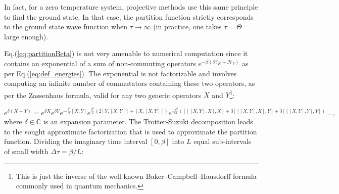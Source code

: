 In fact, for a zero temperature system, projective methods use this same principle to find the ground state.
In that case, the partition function strictly corresponds to the ground state wave function when $\tau \rightarrow \infty$ (in practice, one takes $\tau = \Theta$ large enough).
 
Eq.(\ref{eq:partitionBeta}) is not very amenable to numerical computation since it contains an exponential of a sum of non-commuting operators $e^{-\beta (\mathcal{H}_K + \mathcal{H}_V)}$ as per Eq.(\ref{eq:def_energies}). 
The exponential is not factorizable and involves computing an infinite number of commutators containing these two operators, as per the Zassenhaus formula, valid for any two generic operators $X$ and $Y$\footnote{This is just the inverse of the well known Baker–Campbell–Hausdorff formula commonly used in quantum mechanics.}:

\begin{equation}\label{eq:zassenhaus}
e^{\delta (X+Y)}=e^{\delta X} e^{\delta Y} e^{-{\frac {\delta^{2}}{2}}[X,Y]} e^{{\frac {\delta^{3}}{6}}(2[Y,[X,Y]]+[X,[X,Y]])}  e^{{\frac {-\delta^{4}}{24}}([[[X,Y],X],X]+3[[[X,Y],X],Y]+3[[[X,Y],Y],Y])} \, ... , 
\end{equation}
where $\delta \in \mathbb{C}$ is an expansion parameter.
The Trotter-Suzuki decomposition leads to the sought approximate factorization that is used to approximate the partition function.
Dividing the imaginary time interval $[0, \beta ]$ into $L$ equal sub-intervals of small width $\Delta \tau = \beta / L$:


